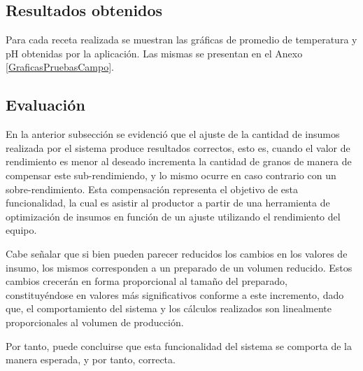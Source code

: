     \subsection{Resultados obtenidos}
        \par Para cada receta realizada se muestran las gráficas de promedio de temperatura y pH obtenidas por la aplicación. Las mismas se presentan en el Anexo \ref{GraficasPruebasCampo}.
    
    \subsection{Evaluación}
        \par En la anterior subsección se evidenció que el ajuste de la cantidad de insumos realizada por el sistema produce resultados correctos, esto es, cuando el valor de rendimiento es menor al deseado incrementa la cantidad de granos de manera de compensar este sub-rendimiendo, y lo mismo ocurre en caso contrario con un sobre-rendimiento. Esta compensación representa el objetivo de esta funcionalidad, la cual es asistir al productor a partir de una herramienta de optimización de insumos en función de un ajuste utilizando el rendimiento del equipo.
        
        \par Cabe señalar que si bien pueden parecer reducidos los cambios en los valores de insumo, los mismos corresponden a un preparado de un volumen reducido. Estos cambios crecerán en forma proporcional al tamaño del preparado, constituyéndose en valores más significativos conforme a este incremento, dado que, el comportamiento del sistema y los cálculos realizados son linealmente proporcionales al volumen de producción.
        
        \par Por tanto, puede concluirse que esta funcionalidad del sistema se comporta de la manera esperada, y por tanto, correcta. 